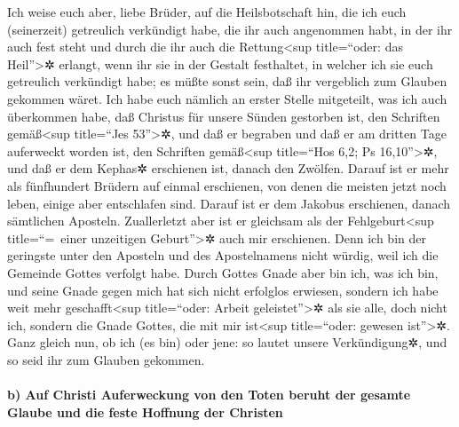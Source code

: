  Ich weise euch aber, liebe Brüder, auf die Heilsbotschaft
hin, die ich euch (seinerzeit) getreulich verkündigt habe, die ihr auch
angenommen habt, in der ihr auch fest steht  und durch die
ihr auch die Rettung\textless sup title=``oder: das Heil''\textgreater✲
erlangt, wenn ihr sie in der Gestalt festhaltet, in welcher ich sie euch
getreulich verkündigt habe; es müßte sonst sein, daß ihr vergeblich zum
Glauben gekommen wäret.  Ich habe euch nämlich an erster
Stelle mitgeteilt, was ich auch überkommen habe, daß Christus für unsere
Sünden gestorben ist, den Schriften gemäß\textless sup title=``Jes
53''\textgreater✲,  und daß er begraben und daß er am
dritten Tage auferweckt worden ist, den Schriften gemäß\textless sup
title=``Hos 6,2; Ps 16,10''\textgreater✲,  und daß er dem
Kephas✲ erschienen ist, danach den Zwölfen.  Darauf ist er
mehr als fünfhundert Brüdern auf einmal erschienen, von denen die
meisten jetzt noch leben, einige aber entschlafen sind. 
Darauf ist er dem Jakobus erschienen, danach sämtlichen Aposteln.
 Zuallerletzt aber ist er gleichsam als der
Fehlgeburt\textless sup title=``=~einer unzeitigen Geburt''\textgreater✲
auch mir erschienen.  Denn ich bin der geringste unter den
Aposteln und des Apostelnamens nicht würdig, weil ich die Gemeinde
Gottes verfolgt habe.  Durch Gottes Gnade aber bin ich,
was ich bin, und seine Gnade gegen mich hat sich nicht erfolglos
erwiesen, sondern ich habe weit mehr geschafft\textless sup
title=``oder: Arbeit geleistet''\textgreater✲ als sie alle, doch nicht
ich, sondern die Gnade Gottes, die mit mir ist\textless sup
title=``oder: gewesen ist''\textgreater✲.  Ganz gleich
nun, ob ich (es bin) oder jene: so lautet unsere Verkündigung✲, und so
seid ihr zum Glauben gekommen.

\hypertarget{b-auf-christi-auferweckung-von-den-toten-beruht-der-gesamte-glaube-und-die-feste-hoffnung-der-christen}{%
\paragraph{b) Auf Christi Auferweckung von den Toten beruht der gesamte
Glaube und die feste Hoffnung der
Christen}\label{b-auf-christi-auferweckung-von-den-toten-beruht-der-gesamte-glaube-und-die-feste-hoffnung-der-christen}}

